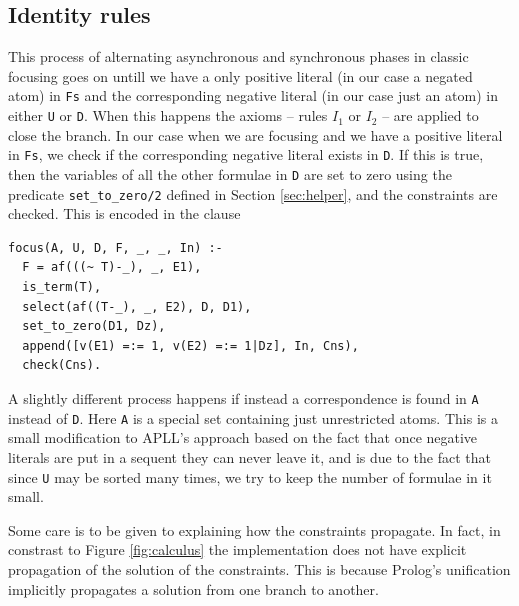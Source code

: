 \documentclass[a4paper, 12pt, english]{report}
\begin{document}
\subsection{Identity rules}
This process of alternating asynchronous and synchronous phases in classic focusing goes on untill we have a only positive literal (in our case a negated atom) in \texttt{Fs} and the corresponding negative literal (in our case just an atom) in either \texttt{U} or \texttt{D}.
When this happens the axioms -- rules $I_1$ or $I_2$ -- are applied to close the branch.
In our case when we are focusing and we have a positive literal in \texttt{Fs}, we check if the corresponding negative literal exists in \texttt{D}.
If this is true, then the variables of all the other formulae in \texttt{D} are set to zero using the predicate \texttt{set\_to\_zero/2} defined in Section \ref{sec:helper}, and the constraints are checked.
This is encoded in the clause 
\begin{verbatim}
focus(A, U, D, F, _, _, In) :-
  F = af(((~ T)-_), _, E1),
  is_term(T),
  select(af((T-_), _, E2), D, D1),
  set_to_zero(D1, Dz),
  append([v(E1) =:= 1, v(E2) =:= 1|Dz], In, Cns),
  check(Cns).
\end{verbatim}
A slightly different process happens if instead a correspondence is found in \texttt{A} instead of \texttt{D}.
Here \texttt{A} is a special set containing just unrestricted atoms.
This is a small modification to APLL's approach based on the fact that once negative literals are put in a sequent they can never leave it, and is due to the fact that since \texttt{U} may be sorted many times, we try to keep the number of formulae in it small.

Some care is to be given to explaining how the constraints propagate.
In fact, in constrast to Figure \ref{fig:calculus} the implementation does not have explicit propagation of the solution of the constraints.
This is because Prolog's unification implicitly propagates a solution from one branch to another.
\end{document}
